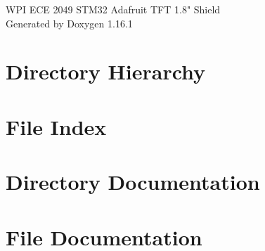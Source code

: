 \documentclass[twoside]{book}
\newcommand{\+}{\discretionary{\mbox{\scriptsize$\hookleftarrow$}}{}{}}
\newcommand{\clearemptydoublepage}{%
    \newpage{\pagestyle{empty}\cleardoublepage}%
  }
\begin{document}
  \raggedbottom
    \hypersetup{pageanchor=false,
                bookmarksnumbered=true,
                pdfencoding=unicode
               }
  \begin{titlepage}
  \vspace*{7cm}
  \begin{center}%
  {\Large WPI ECE 2049 STM32 Adafruit TFT 1.\+8"{} Shield}\\
  \vspace*{1cm}
  {\large Generated by Doxygen 1.16.1}\\
  \end{center}
  \end{titlepage}
  \clearemptydoublepage
  \tableofcontents
  \clearemptydoublepage
  \hypersetup{pageanchor=true}
\chapter{Directory Hierarchy}

\chapter{File Index}

\chapter{Directory Documentation}



\chapter{File Documentation}




  \backmatter
  \newpage
  \clearemptydoublepage
  \printindex
\end{document}
